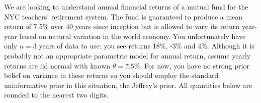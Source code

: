 \documentclass[12pt,landscape]{article}
\begin{document}

\problem{} We are looking to understand annual financial returns of a mutual fund for the NYC teachers' retirement system. The fund is guaranteed to produce a mean return of 7.5\% over 40 years since inception but is allowed to vary its return year-year based on natural variation in the world economy. You unfortunately have only $n=3$  years of data to use: you see returns 18\%, -3\% and 4\%. Although it is probably not an appropriate parametric model for annual return, assume yearly returns are iid normal with known $\theta = 7.5\%$. For now, you have no strong prior belief on variance in these returns so you should employ the standard uninformative prior in this situation, the Jeffrey's prior. All quantities below are rounded to the nearest two digits.


\vspace{-0.2cm}\benum{} 
\end{document}
